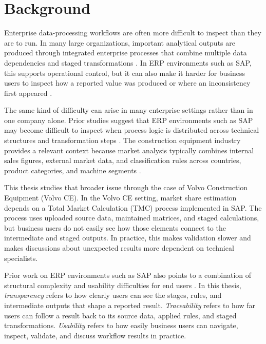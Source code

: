 

\section{Background}
\pagestyle{plain}
Enterprise data-processing workflows are often more difficult to inspect than they are to run. In many large organizations, important analytical outputs are produced through integrated enterprise processes that combine multiple data dependencies and staged transformations \cite{klaus2000,vassiliadis2009etl}. In ERP environments such as SAP, this supports operational control, but it can also make it harder for business users to inspect how a reported value was produced or where an inconsistency first appeared \cite{weber2022sap,foidl2024pipeline}.

The same kind of difficulty can arise in many enterprise settings rather than in one company alone. Prior studies suggest that ERP environments such as SAP may become difficult to inspect when process logic is distributed across technical structures and transformation steps \cite{weber2022sap}. The construction equipment industry provides a relevant context because market analysis typically combines internal sales figures, external market data, and classification rules across countries, product categories, and machine segments \cite{cece2025}.

This thesis studies that broader issue through the case of Volvo Construction Equipment (Volvo CE). In the Volvo CE setting, market share estimation depends on a Total Market Calculation (TMC) process implemented in SAP. The process uses uploaded source data, maintained matrices, and staged calculations, but business users do not easily see how those elements connect to the intermediate and staged outputs. In practice, this makes validation slower and makes discussions about unexpected results more dependent on technical specialists.

Prior work on ERP environments such as SAP also points to a combination of structural complexity and usability difficulties for end users \cite{weber2022sap,wong2016sap}. In this thesis, \textit{transparency} refers to how clearly users can see the stages, rules, and intermediate outputs that shape a reported result. \textit{Traceability} refers to how far users can follow a result back to its source data, applied rules, and staged transformations. \textit{Usability} refers to how easily business users can navigate, inspect, validate, and discuss workflow results in practice.

